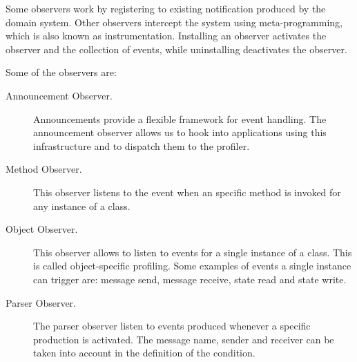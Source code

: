 \documentclass[runningheads]{llncs}
\newcommand{\lr}[1]{\nb{Lukas}{orange}{#1}}
\newcommand{\on}[1]{\nb{Oscar}{olive}{#1}}
\begin{document}
Some observers work by registering to existing notification produced by the domain system. Other observers intercept the system using meta-programming, which is also known as instrumentation.
Installing an observer activates the observer and the collection of events, while uninstalling deactivates the observer. 


Some of the observers are:
\begin{description}
    \item[Announcement Observer.] Announcements provide a flexible framework for event handling. The announcement observer allows us to hook into applications using this infrastructure and to dispatch them to the profiler.
    \item[Method Observer.] This observer listens to the event when an specific method is invoked for any instance of a class.
    \item[Object Observer.] This observer allows to listen to events for a single instance of a class.
    This is called object-specific profiling. Some examples of events a single instance can trigger are: message send, message receive, state read and state write.
    \item[Parser Observer.] The parser observer listen to events produced whenever a specific production is activated.
    The message name, sender and receiver can be taken into account in the definition of the condition. 
\end{description}
\end{document}
